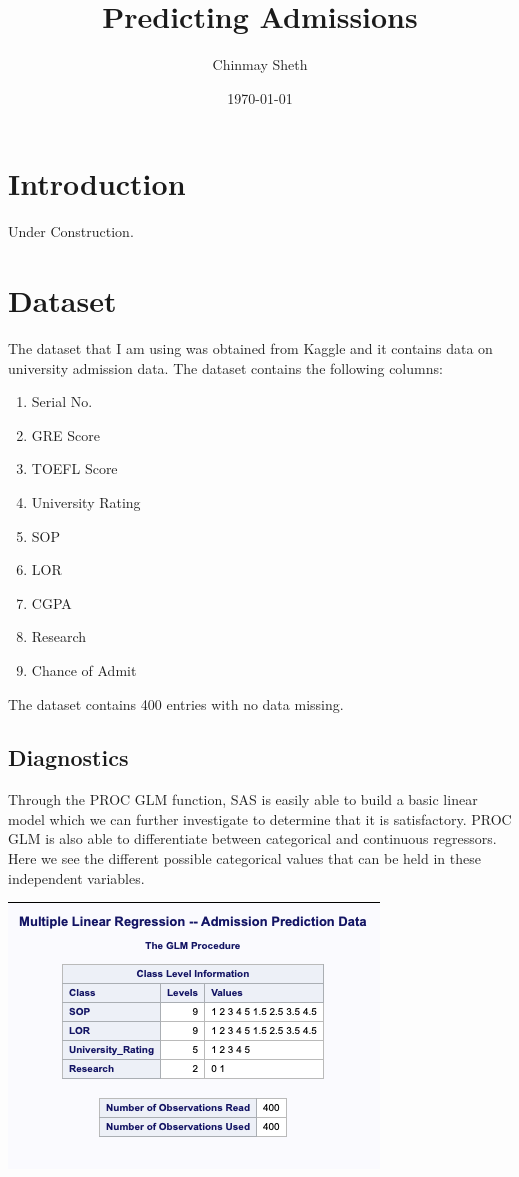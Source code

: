 \documentclass{article}
\title{Predicting Admissions}
\author{Chinmay Sheth}
\date\today
\begin{document}
\maketitle

\section*{Introduction}

Under Construction.

\section*{Dataset}

The dataset that I am using was obtained from Kaggle and it contains data on university admission data. The dataset contains the following columns:

\begin{enumerate}

\item Serial No.
\item GRE Score
\item TOEFL Score
\item University Rating
\item SOP
\item LOR
\item CGPA
\item Research
\item Chance of Admit

\end{enumerate}


The dataset contains 400 entries with no data missing.

\subsection*{Diagnostics}

Through the PROC GLM function, SAS is easily able to build a basic linear model which we can further investigate to determine that it is satisfactory. PROC GLM is also able to differentiate between categorical and continuous regressors. Here we see the different possible categorical values that can be held in these independent variables.

\includegraphics[scale=1]{GLM_Procedure.png}
\end{document}
